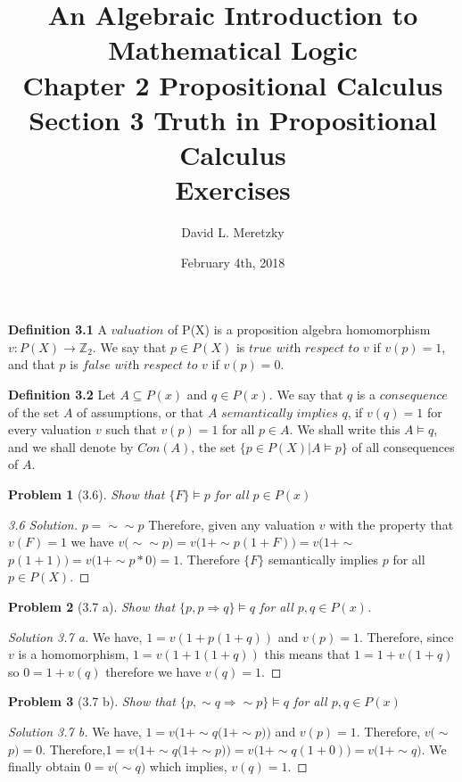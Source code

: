 \documentclass{article}
\title{ \vspace{-10ex} %
An Algebraic Introduction to Mathematical Logic\\
Chapter 2 Propositional Calculus \\
Section 3 Truth in Propositional Calculus \\
Exercises 
}
\author{David L. Meretzky
}
\date{%
February 4th, 2018
}
\theoremstyle{problemstyle}
\newtheorem{problem}{Problem}
\begin{document}
\maketitle

\begin{flushleft}
\textbf{Definition 3.1}
A $valuation$ of P(X) is a proposition algebra homomorphism $v:P(X) \rightarrow \mathbb{Z}_2$. We say that $p \in P(X)$ is $\textit{true with respect to v}$ if $v(p) = 1$, and that $p$ is $\textit{false with respect to v}$ if $v(p) = 0.$
\end{flushleft}
\begin{flushleft}
\textbf{Definition 3.2}
Let $A\subseteq P(x)$ and $q \in P(x)$. We say that $q$ is a $consequence$ of the set $A$ of assumptions, or that $\textit{A semantically implies q}$, if $v(q) = 1$ for every valuation $v$ such that $v(p) = 1$ for all $p \in A$. We shall write this $A \models q$, and we shall denote by $Con(A)$, the set $\{p\in P(X)|A\models p\}$ of all consequences of $A$.
\end{flushleft}

\begin{problem}[3.6] 
Show that $\{F\}\models p$ for all $p \in P(x)$
\end{problem}

\begin{proof}[3.6 Solution]
$p = \sim\sim$$p$
Therefore, given any valuation $v$ with the property that $v(F) = 1$ we have $v(\sim\sim$$p) = v(1+\sim$$p(1+F))=v(1+\sim$$p(1+1)) = v(1+\sim$$p*0) = 1$. Therefore $\{F\}$ semantically implies $p$ for all $p \in P(X)$. 
\end{proof}

\begin{problem}[3.7 a] 
Show that $\{p, p\Rightarrow q\}\models q$ for all $p,q \in P(x)$.
\end{problem}
\begin{proof}[Solution 3.7 a] 
We have, $1 = v(1+p(1+q))$ and $v(p) = 1$. Therefore, since $v$ is a homomorphism, $1 = v(1+1(1+q))$ this means that $1 = 1 + v(1+q)$ so $0 = 1 + v(q)$ therefore we have $v(q) = 1$. 
\end{proof}

\begin{problem}[3.7 b] 
Show that $\{p, \sim$$q\Rightarrow \sim$$p\}\models q$ for all $p,q \in P(x)$
\end{problem}

\begin{proof}[Solution 3.7 b] 
We have, $1 = v(1 + \sim$$q(1+\sim$$p))$ and $v(p) = 1$. Therefore, $v(\sim$$p) = 0$. Therefore,$1 = v(1 + \sim$$q(1+\sim$$p)) = v(1+\sim$$q(1+0)) = v(1+\sim$$q)$. We finally obtain $0 = v(\sim$$q)$ which implies, $v(q) = 1$.
\end{proof}
\end{document}
